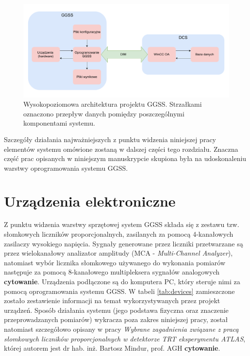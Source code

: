 \begin{figure}[H]
\centering
\includegraphics[width=\textwidth]{components/ggss_images/high_level_architecture.pdf}
\caption{Wysokopoziomowa architektura projektu GGSS. Strzałkami oznaczono przepływ danych pomiędzy poszczególnymi komponentami systemu.}
\label{fig:high_level_architecture}
\end{figure}


Szczegóły działania najważniejszych z punktu widzenia niniejszej pracy elementów systemu omówione zostaną w dalszej części tego rozdziału. Znaczna część prac opisanych w niniejszym manuskrypcie skupiona była na udoskonaleniu warstwy oprogramowania systemu GGSS.


\section{Urządzenia elektroniczne}
Z punktu widzenia warstwy sprzętowej system GGSS składa się z zestawu tzw. słomkowych liczników proporcjonalnych, zasilanych za pomocą 4-kanałowych zasilaczy wysokiego napięcia. Sygnały generowane przez liczniki przetwarzane są przez wielokanałowy analizator amplitudy (MCA - \emph{Multi-Channel Analyzer}), natomiast wybór licznika słomkowego używanego do wykonania pomiarów następuje za pomocą 8-kanałowego multipleksera sygnałów analogowych \textbf{cytowanie}. Urządzenia podłączone są do komputera PC, który steruje nimi za pomocą oprogramowania systemu GGSS. W tabeli \ref{tab:devices} zamieszczone zostało zestawienie informacji na temat wykorzystywanych przez projekt urządzeń. Sposób działania systemu (jego podstawa fizyczna oraz znaczenie przeprowadzanych pomiarów) wykracza poza zakres niniejszej pracy, został natomiast szczegółowo opisany w pracy \emph{Wybrane zagadnienia związane z pracą słomkowych liczników proporcjonalnych w detektorze TRT eksperymentu ATLAS}, której autorem jest dr hab. inż. Bartosz Mindur, prof. AGH \textbf{cytowanie}.

